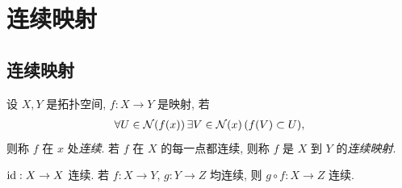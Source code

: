 \section{连续映射}
\subsection{连续映射}
    \begin{Definition}[连续映射]
        设 $ X, Y $ 是拓扑空间, $ f: X\to Y $ 是映射, 若
        \begin{align*}
            \forall U\in \mathcal{N}(f(x))\,\exists V\in\mathcal{N}(x)\,(f(V)\subset U),
        \end{align*}
        则称 $ f $ 在 $ x $ 处\emph{连续}. 若 $ f $ 在 $ X $ 的每一点都连续, 则称 $ f $ 是 $ X $ 到 $ Y $ 的\emph{连续映射}.
    \end{Definition}

    \begin{Example}
        $ \mathrm{id}: X\to X $ 连续. 若 $ f: X\to Y $, $ g: Y\to Z $ 均连续, 则 $ g\circ f: X\to Z $ 连续. 
    \end{Example}

